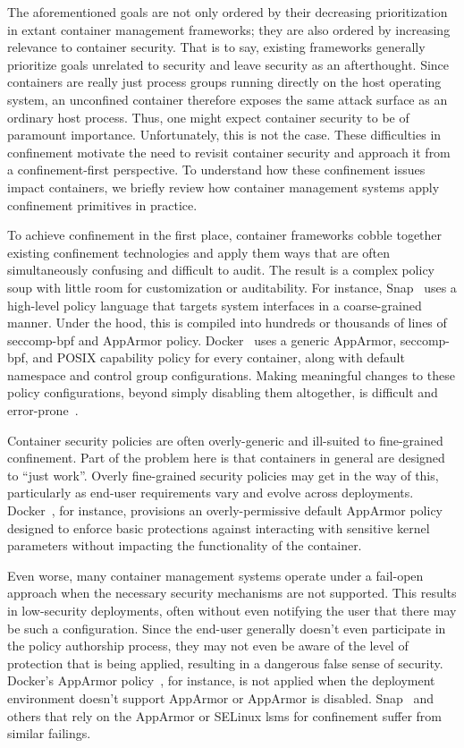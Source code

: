 The aforementioned goals are not only ordered by their decreasing prioritization in extant
container management frameworks; they are also ordered by increasing relevance to
container security. That is to say, existing frameworks generally prioritize goals
unrelated to security and leave security as an afterthought. Since containers are really
just process groups running directly on the host operating system, an unconfined container
therefore exposes the same attack surface as an ordinary host process. Thus, one might
expect container security to be of paramount importance. Unfortunately, this is not the
case. These difficulties in confinement motivate the need to revisit container security
and approach it from a confinement-first perspective. To understand how these confinement
issues impact containers, we briefly review how container management systems apply
confinement primitives in practice.

To achieve confinement in the first place, container frameworks cobble together existing
confinement technologies and apply them ways that are often simultaneously confusing and
difficult to audit. The result is a complex policy soup with little room for customization
or auditability. For instance, Snap~\cite{snap} uses a high-level policy language that
targets system interfaces in a coarse-grained manner. Under the hood, this is compiled
into hundreds or thousands of lines of seccomp-bpf and AppArmor policy.
Docker~\cite{docker_security, docker_default_apparmor, docker_apparmor} uses a generic
AppArmor, seccomp-bpf, and POSIX capability policy for every container, along with default
namespace and control group configurations. Making meaningful changes to these policy
configurations, beyond simply disabling them altogether, is difficult and
error-prone~\cite{lin2018_container_security}.

Container security policies are often overly-generic and ill-suited to fine-grained
confinement. Part of the problem here is that containers in general are designed to
\enquote{just work}. Overly fine-grained security policies may get in the way of this,
particularly as end-user requirements vary and evolve across deployments.
Docker~\cite{docker_security}, for instance, provisions an overly-permissive default
AppArmor policy~\cite{docker_default_apparmor} designed to enforce basic protections
against interacting with sensitive kernel parameters without impacting the functionality
of the container. 

Even worse, many container management systems operate under a fail-open approach when the
necessary security mechanisms are not supported. This results in low-security deployments,
often without even notifying the user that there may be such a configuration. Since the
end-user generally doesn't even participate in the policy authorship process, they may not
even be aware of the level of protection that is being applied, resulting in a dangerous
false sense of security. Docker's AppArmor policy~\cite{docker_apparmor,
docker_default_apparmor}, for instance, is not applied when the deployment environment
doesn't support AppArmor or AppArmor is disabled. Snap~\cite{snap} and others that rely on
the AppArmor or SELinux \glspl{lsm} for confinement suffer from similar failings.

